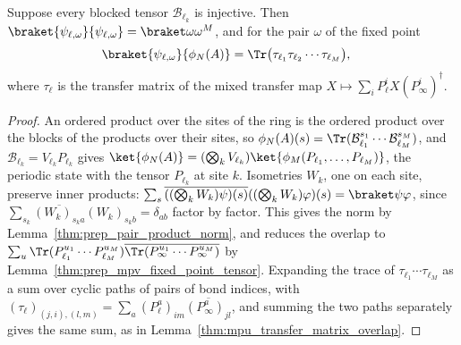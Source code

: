 \begin{lemma}
    \label{lem:ldp_block_isometry_state_overlap}
    \leanok
    Suppose every blocked tensor $\mathcal B_{\ell_k}$ is injective. Then
    $\braket{\psi_{\ell,\omega}}{\psi_{\ell,\omega}}=\braket\omega\omega^M$, and
    for the pair $\omega$ of the fixed point
    \begin{align}
        \braket{\psi_{\ell,\omega}}{\phi_N(A)}
         & =\Tr\bigl(\tau_{\ell_1}\tau_{\ell_2}\cdots\tau_{\ell_M}\bigr),
        \label{eq:ldp_block_isometry_state_overlap}
    \end{align}
    where $\tau_\ell$ is the transfer matrix of the mixed transfer map
    $X\mapsto\sum_iP_\ell^iX(P_\infty^i)^\dagger$.
\end{lemma}
\begin{proof}
    \leanok
    An ordered product over the sites of the ring is the ordered product over
    the blocks of the products over their sites, so
    $\phi_N(A)(s)=\Tr(\mathcal B_{\ell_1}^{s_1}\cdots\mathcal B_{\ell_M}^{s_M})$,
    and $\mathcal B_{\ell_k}=V_{\ell_k}P_{\ell_k}$ gives
    $\ket{\phi_N(A)}=(\bigotimes_kV_{\ell_k})\ket{\phi_M(P_{\ell_1},\dots,P_{\ell_M})}$,
    the periodic state with the tensor $P_{\ell_k}$ at site $k$. Isometries
    $W_k$, one on each site, preserve inner products:
    $\sum_s\overline{((\bigotimes_kW_k)\psi)(s)}((\bigotimes_kW_k)\varphi)(s)
        =\braket\psi\varphi$, since
    $\sum_{s_k}\overline{(W_k)_{s_ka}}(W_k)_{s_kb}=\delta_{ab}$ factor by factor.
    This gives the norm by Lemma~\ref{thm:prep_pair_product_norm}, and reduces
    the overlap to
    $\sum_u\Tr(P_{\ell_1}^{u_1}\cdots P_{\ell_M}^{u_M})
        \overline{\Tr(P_\infty^{u_1}\cdots P_\infty^{u_M})}$ by
    Lemma~\ref{thm:prep_mpv_fixed_point_tensor}. Expanding the trace of
    $\tau_{\ell_1}\cdots\tau_{\ell_M}$ as a sum over cyclic paths of pairs of
    bond indices, with
    $(\tau_\ell)_{(j,i),(l,m)}=\sum_a(P_\ell^a)_{im}\overline{(P_\infty^a)_{jl}}$,
    and summing the two paths separately gives the same sum, as in
    Lemma~\ref{thm:mpu_transfer_matrix_overlap}.
\end{proof}

